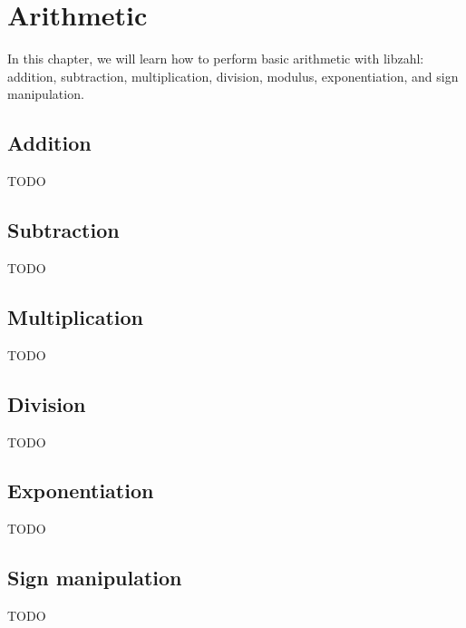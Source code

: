 \chapter{Arithmetic}
\label{chap:Arithmetic}

In this chapter, we will learn how to perform basic
arithmetic with libzahl: addition, subtraction,
multiplication, division, modulus, exponentiation,
and sign manipulation.

\vspace{1cm}
\minitoc


\newpage
\section{Addition}
\label{sec:Addition}

TODO %


\newpage
\section{Subtraction}
\label{sec:Subtraction}

TODO %


\newpage
\section{Multiplication}
\label{sec:Multiplication}

TODO %


\newpage
\section{Division}
\label{sec:Division}

TODO %


\newpage
\section{Exponentiation}
\label{sec:Exponentiation}

TODO %


\newpage
\section{Sign manipulation}
\label{sec:Sign manipulation}

TODO %
